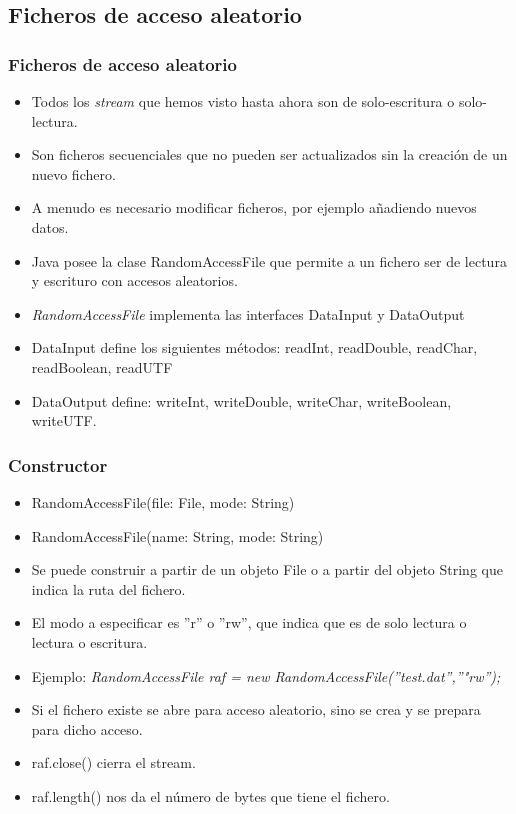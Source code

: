\documentclass{beamer}
\begin{document}
\subsection{Ficheros de acceso aleatorio}

\begin{frame}[fragile]
\frametitle{Ficheros de acceso aleatorio}
\begin{itemize}[<+->]
\item Todos los \emph{stream} que hemos visto hasta ahora son de solo-escritura o solo-lectura.
\item Son ficheros secuenciales que no pueden ser actualizados sin la creación de un nuevo fichero.
\item A menudo es necesario modificar ficheros, por ejemplo añadiendo nuevos datos.
\item Java posee la clase \alert{RandomAccessFile} que permite a un fichero ser de lectura y escrituro con accesos aleatorios.
\item \emph{RandomAccessFile} implementa las interfaces \alert{DataInput} y \alert{DataOutput}
\item DataInput define los siguientes métodos: \alert{readInt, readDouble, readChar, readBoolean, readUTF}
\item DataOutput define: \alert{writeInt, writeDouble, writeChar, writeBoolean, writeUTF}.
\end{itemize}
\end{frame}

\begin{frame}
\frametitle{Constructor}
\begin{itemize}[<+->]
\item RandomAccessFile(file: File, mode: String) 
\item RandomAccessFile(name: String, mode: String) 
\item Se puede construir a partir de un objeto File o a partir del objeto String que indica la ruta del fichero.
\item El modo a especificar es ''r'' o ''rw'', que indica que es de solo lectura o lectura o escritura.
\item Ejemplo: \emph{RandomAccessFile raf = new RandomAccessFile(''test.dat'',''"rw'');}
\item Si el fichero existe se abre para acceso aleatorio, sino se crea y se prepara para dicho acceso.
\item \alert{raf.close()} cierra el stream.
\item \alert{raf.length()} nos da el número de bytes que tiene el fichero.
\end{itemize}
\end{frame}
\end{document}
